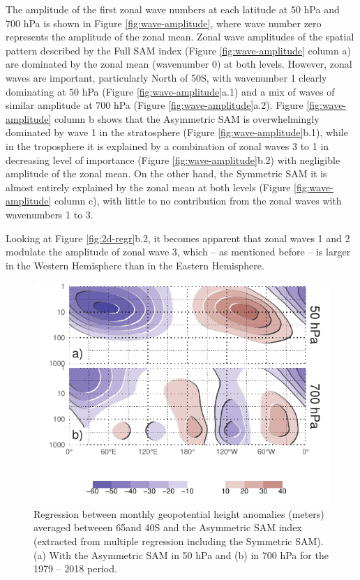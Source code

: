 \documentclass[smallextended]{svjour3}       %
\begin{document}
The amplitude of the first zonal wave numbers at each latitude at 50 hPa and 700 hPa is shown in Figure \ref{fig:wave-amplitude}, where wave number zero represents the amplitude of the zonal mean. Zonal wave amplitudes of the spatial pattern described by the Full SAM index (Figure \ref{fig:wave-amplitude} column a) are dominated by the zonal mean (wavenumber 0) at both levels. However, zonal waves are important, particularly North of 50\degree S, with wavenumber 1 clearly dominating at 50 hPa (Figure \ref{fig:wave-amplitude}a.1) and a mix of waves of similar amplitude at 700 hPa (Figure \ref{fig:wave-amplitude}a.2). Figure \ref{fig:wave-amplitude} column b shows that the Asymmetric SAM is overwhelmingly dominated by wave 1 in the stratosphere (Figure \ref{fig:wave-amplitude}b.1), while in the troposphere it is explained by a combination of zonal waves 3 to 1 in decreasing level of importance (Figure \ref{fig:wave-amplitude}b.2) with negligible amplitude of the zonal mean. On the other hand, the Symmetric SAM it is almost entirely explained by the zonal mean at both levels (Figure \ref{fig:wave-amplitude} column c), with little to no contribution from the zonal waves with wavenumbers 1 to 3.

Looking at Figure \ref{fig:2d-regr}b.2, it becomes apparent that zonal waves 1 and 2 modulate the amplitude of zonal wave 3, which -- as mentioned before -- is larger in the Western Hemisphere than in the Eastern Hemisphere.

\begin{figure}
\includegraphics{vertical-regression-1} \caption{Regression between monthly geopotential height anomalies (meters) averaged betweeen 65\degree and 40\degree S and the Asymmetric SAM index (extracted from multiple regression including the Symmetric SAM). (a) With the Asymmetric SAM in 50 hPa and (b) in 700 hPa for the 1979 -- 2018 period.}\label{fig:vertical-regression}
\end{figure}
\end{document}
